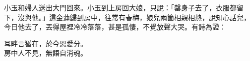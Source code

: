 小玉和婦人送出大門回來。小玉到上房回大娘，只說：「罄身子去了，衣服都留下，沒與他。」這金蓮歸到房中，往常有春梅，娘兒兩箇相親相熱，說知心話兒，今日他去了，丟得屋裡冷冷落落，甚是孤悽，不覺放聲大哭。有詩為證：

\begin{myquote}
耳畔言猶在，於今恩愛分。\\房中人不見，無語自消魂。
\end{myquote}

